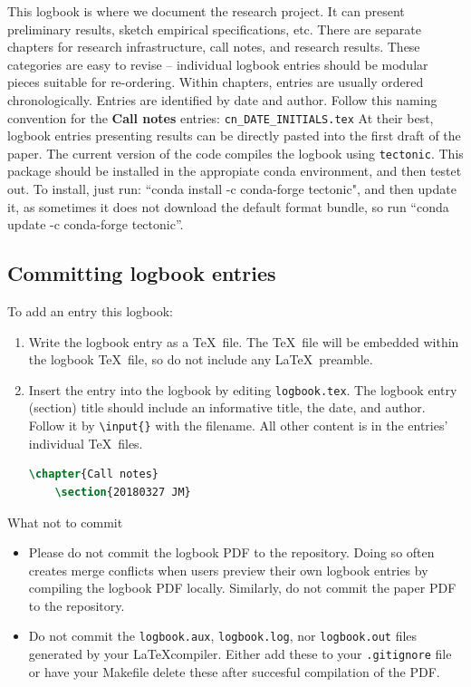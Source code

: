 
This logbook is where we document the research project.
It can present preliminary results, sketch empirical specifications, etc.
There are separate chapters for research infrastructure, call notes, and research results.
These categories are easy to revise -- individual logbook entries should be modular pieces suitable for re-ordering.
Within chapters, entries are usually ordered chronologically. Entries are identified by date and author.
Follow this naming convention for the \textbf{Call notes} entries: \texttt{cn\_DATE\_INITIALS.tex}
At their best, logbook entries presenting results can be directly pasted into the first draft of the paper.
The current version of the code compiles the logbook using \texttt{tectonic}. This package should be installed in the appropiate
conda environment, and then testet out. To install, just run: ``conda install -c conda-forge tectonic", and then 
update it, as sometimes it does not download the default format bundle, so run ``conda update -c conda-forge tectonic''.

\subsection{Committing logbook entries}

To add an entry this logbook:
\begin{enumerate}
	\item Write the logbook entry as a \TeX\ file. The \TeX\ file will be embedded within the logbook \TeX\ file, so do not include any \LaTeX\ preamble.
	\item Insert the entry into the logbook by editing \texttt{logbook.tex}.
	The logbook entry (section) title should include an informative title, the date, and author. 
	Follow it by \texttt{\textbackslash input\{\}} with the filename.
	All other content is in the entries' individual \TeX\ files.
	\begin{lstlisting}[language=tex]
	\chapter{Call notes}
	\section{20180327 JM} 
	\end{lstlisting}
\end{enumerate}

What not to commit 
\begin{itemize}
	\item Please do not commit the logbook PDF to the repository. 
	Doing so often creates merge conflicts when users preview their own logbook entries by compiling the logbook PDF locally.
	Similarly, do not commit the paper PDF to the repository.
	\item Do not commit the \texttt{logbook.aux}, \texttt{logbook.log}, nor \texttt{logbook.out} files generated by your \LaTeX compiler.
	Either add these to your \texttt{.gitignore} file or have your Makefile delete these after succesful compilation of the PDF.
\end{itemize}
